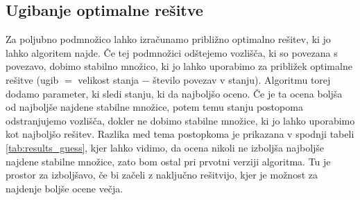 \documentclass[slovenian, 10pt, titlepage, a4paper]{article}
\begin{document}
    \subsection{Ugibanje optimalne rešitve}
    Za poljubno podmnožico lahko izračunamo približno optimalno rešitev, ki jo lahko algoritem najde.
    Če tej podmnožici odštejemo vozlišča, ki so povezana s povezavo, dobimo stabilno množico, ki jo lahko uporabimo za približek optimalne rešitve (ugib $=$ velikost stanja $-$ število povezav v stanju).
    Algoritmu torej dodamo parameter, ki sledi stanju, ki da najboljšo oceno.
    Če je ta ocena boljša od najboljše najdene stabilne množice, potem temu stanju postopoma odstranjujemo vozlišča, dokler ne dobimo stabilne množice, ki jo lahko uporabimo kot najboljšo rešitev.
    Razlika med tema postopkoma je prikazana v spodnji tabeli \ref{tab:results_guess}, kjer lahko vidimo, da ocena nikoli ne izboljša najboljše najdene stabilne množice, zato bom ostal pri prvotni verziji algoritma.
    Tu je prostor za izboljšavo, če bi začeli z naključno rešitvijo, kjer je možnost za najdenje boljše ocene večja.
    \begin{table}[H]
        \centering
        \resizebox{\columnwidth}{!}{%
        
        }
        \caption{Primerjava med najboljšo najdeno stabilno množico in najboljšo oceno, ki jo je algoritem našel. Za vse primere so bili uporabljeni parametri $A = 1.0$, $B = 2.0$, baza $b = 8$.}
        \label{tab:results_guess}
    \end{table}
\end{document}
